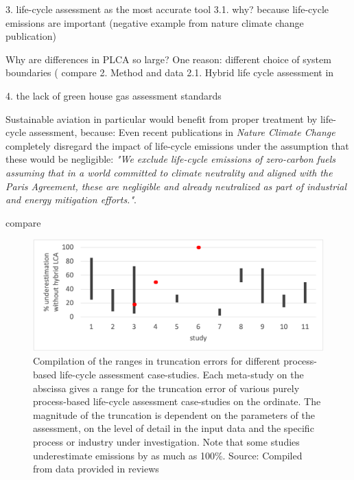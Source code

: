 \documentclass{article}
\begin{document}
    3. life-cycle assessment as the most accurate tool
        3.1. why? because life-cycle emissions are important (negative example from nature climate change publication)
        
        Why are differences in PLCA so large? One reason: different choice of system boundaries ( compare 2. Method and data 2.1. Hybrid life cycle assessment in \cite{teh_hybrid_2017}
        
    
    4. the lack of green house gas assessment standards
    
    Sustainable aviation in particular would benefit from proper treatment by life-cycle assessment, because:
    Even recent publications in \textit{Nature Climate Change} completely disregard the impact of life-cycle emissions under the assumption that these would be negligible: \textit{"We exclude life-cycle emissions of zero-carbon fuels assuming that in a world committed to climate neutrality and aligned with the Paris Agreement, these are negligible and already neutralized as part of industrial and energy mitigation efforts."}\cite{brazzola_definitions_2022}.
    
    compare \cite{bourgault_documentation_2021}
        
\begin{figure}[h!]
	\centering
	\includegraphics[width=\textwidth]{figures/underestimation_excel.png}
	\caption{Compilation of the ranges in truncation errors for different process-based life-cycle assessment case-studies. Each meta-study on the abscissa gives a range for the truncation error of various purely process-based life-cycle assessment case-studies on the ordinate. The magnitude of the truncation is dependent on the parameters of the assessment, on the level of detail in the input data and the specific process or industry under investigation. Note that some studies underestimate emissions by as much as 100\%. Source: Compiled from data provided in reviews \cite{rebitzer_input-output_2002}\cite{lenzen_errors_2000}\cite{agez_hybridization_2020}\cite{agez_correcting_2022}\cite{agez_lifting_2019}}
	\label{fig:performance}
\end{figure}
\end{document}
